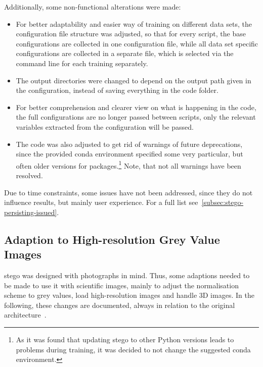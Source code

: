 Additionally, some non-functional alterations were made:
\begin{itemize}
    \item For better adaptability and easier way of training on different data sets, the configuration file structure was adjusted, so that for every script, the base configurations are collected in one configuration file, while all data set specific configurations are collected in a separate file, which is selected via the command line for each training separately.
    \item The output directories were changed to depend on the output path given in the configuration, instead of saving everything in the code folder.
    \item For better comprehension and clearer view on what is happening in the code, the full configurations are no longer passed between scripts, only the relevant variables extracted from the configuration will be passed.
    \item The code was also adjusted to get rid of warnings of future deprecations, since the provided conda environment specified some very particular, but often older versions for packages.\footnote{As it was found that updating \gls{stego} to other Python versions leads to problems during training, it was decided to not change the suggested conda environment.}
    Note, that not all warnings have been resolved.
\end{itemize} 

Due to time constraints, some issues have not been addressed, since they do not influence results, but mainly user experience.
For a full list see~\autoref{subsec:stego-persisting-issued}.


\subsection{Adaption to High-resolution Grey Value Images}
\gls{stego} was designed with photographs in mind.
Thus, some adaptions needed to be made to use it with scientific images, mainly to adjust the normalisation scheme to grey values, load high-resolution images and handle 3D images.
In the following, these changes are documented, always in relation to the original architecture~\autocite{Hamilton2022}.

